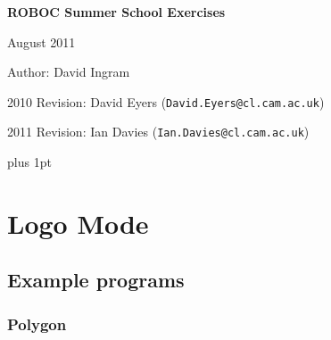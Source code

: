 \documentclass[12pt,a4paper,twoside]{article}
\renewcommand{\_}{\texttt{\symbol{95}}}
\begin{document}
\centerline{\textbf{\LARGE ROBOC Summer School Exercises}}
\vspace{0.5cm}
\centerline{August 2011}
\centerline{Author: David Ingram}
\centerline{2010 Revision: David Eyers (\texttt{David.Eyers@cl.cam.ac.uk})}
\centerline{2011 Revision: Ian Davies (\texttt{Ian.Davies@cl.cam.ac.uk})}

{ \parskip 1mm plus 1pt \tableofcontents }

%
%
%
%
%

\section{Logo Mode} \label{sec:logo-mode}

\subsection{Example programs}

\subsubsection*{Polygon}
\end{document}
